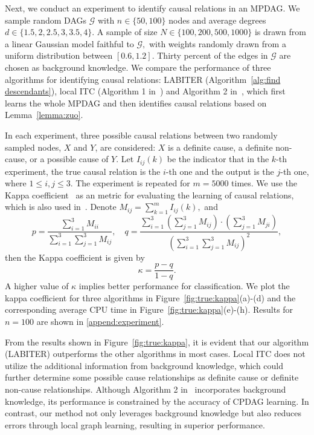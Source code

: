 \documentclass{article}
\begin{document}
Next, we conduct an experiment to identify causal relations in an MPDAG.
We sample random DAGs $\mathcal{G}$ with $n\in \{50, 100\}$ nodes and average degrees $d\in \{1.5, 2, 2.5, 3, 3.5, 4\}.$ A sample of size $N\in \{100, 200, 500, 1000\}$ is drawn from a linear Gaussian model faithful to $\mathcal{G},$ with weights  randomly drawn from a uniform distribution between $[0.6, 1.2].$
Thirty percent of the edges in $\mathcal{G}$ are chosen as background knowledge.
We compare the performance of three algorithms for identifying causal relations: LABITER (Algorithm~\ref{alg:find descendants}), local ITC (Algorithm 1 in~\citet{fang2022local}) and Algorithm 2 in~\citet{zuo2022counterfactual}, which first learns the whole MPDAG and then identifies causal relations based on Lemma~\ref{lemma:zuo}.

In each experiment, three possible causal relations between two randomly sampled nodes, $X$ and $Y$, are considered: $X$ is a definite cause, a definite non-cause, or a possible cause of $Y.$
Let $I_{ij}(k)$ be the indicator that in the $k$-th experiment, the true causal relation is the $i$-th one and the output is the $j$-th one, where $1\le i,j\le 3$.
The experiment is repeated for $m=5000$ times.
We use the Kappa coefficient~\citep{cohen1960coefficient} as an metric for evaluating the learning of causal relations, which is also used in~\citep{fang2022local}. Denote $M_{ij}=\sum_{k=1}^{m}I_{ij}(k),$ and
$$p=\frac{\sum_{i=1}^{3}M_{ii}}{\sum_{i=1}^{3}\sum_{j=1}^{3}M_{ij}}, \quad q=\frac{\sum_{i=1}^{3}\left(\sum_{j=1}^{3}M_{ij}\right)\cdot \left(\sum_{j=1}^{3}M_{ji}\right)}{\left(\sum_{i=1}^{3}\sum_{j=1}^{3}M_{ij}\right)^2},$$
then the Kappa coefficient is given by
$$\kappa = \frac{p-q}{1-q}.$$
A higher value of $\kappa$ implies better performance for classification. We plot the kappa coefficient for three algorithms in Figure~\ref{fig:true:kappa}(a)-(d) and the corresponding average CPU time in Figure~\ref{fig:true:kappa}(e)-(h). Results for $n=100$ are shown in \ref{append:experiment}.

From the results shown in Figure~\ref{fig:true:kappa}, it is evident that our algorithm (LABITER) outperforms the other algorithms in most cases. Local ITC does not utilize the additional information from background knowledge, which could further determine some possible cause relationships as definite cause or definite non-cause relationships. Although Algorithm 2 in~\citet{zuo2022counterfactual} incorporates background knowledge, its performance is constrained by the accuracy of  CPDAG learning. In contrast, our method not only leverages background knowledge but also reduces errors through local graph learning, resulting in superior performance.
\end{document}
